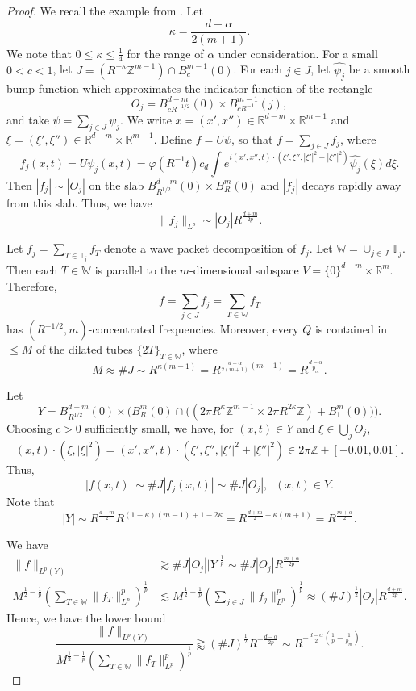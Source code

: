 \documentclass[11pt]{amsart}
\theoremstyle{definition}
\theoremstyle{remark}
\numberwithin{equation}{section}
\renewcommand{\hat}{\widehat}
\newcommand{\R}{\mathbb{R}}
\newcommand{\Z}{\mathbb{Z}}
\newcommand{\W}{\mathbb{W}}
\newcommand{\T}{\mathbb{T}}
\newcommand{\les}{\lesssim}
\begin{document}
\begin{proof}
We recall the example from \cite{du2023weighted}. Let 
\[ \kappa = \frac{d-\alpha}{2(m+1)}.\] 
We note that $0\leq \kappa  \leq \frac{1}{4}$ for the range of $\alpha$ under consideration.
For a small $0<c<1$, let $J = (R^{-\kappa}\Z^{m-1}) \cap B^{m-1}_{c}(0)$. For each $j\in J$, let $\hat{\psi_{j}}$ be a smooth bump function which approximates the indicator function of the rectangle
\[ O_j =B^{d-m}_{cR^{-1/2}}(0) \times B^{m-1}_{cR^{-1}}(j), \]
and take $\psi = \sum_{j\in J} \psi_j$. 
We write $x=(x',x'') \in \R^{d-m} \times \R^{m-1}$ and $\xi=(\xi',\xi'') \in \R^{d-m} \times \R^{m-1}$. 
Define $f=U\psi$, so that $f  = \sum_{j\in J} f_j$, where 
\[ f_j(x,t) = U \psi_{j}(x,t) =  \varphi(R^{-1} t) c_d \int e^{i(x',x'',t) \cdot (\xi',\xi'', |\xi'|^2+|\xi''|^2)} \hat{\psi_{j}}(\xi) d\xi.\]
Then $|f_{j}| \sim |O_j|$ on the slab $B^{d-m}_{R^{1/2}}(0) \times B^{m}_{R}(0)$ and $|f_j|$ decays rapidly away from this slab. Thus, we have
\[ \| f_j \|_{L^p} \sim | O_j| R^{\frac{d+m}{2p}}. \] 


Let $f_j = \sum_{T\in \T_j} f_T$ denote a wave packet decomposition of $f_j$. Let $\W = \cup_{j\in J} \T_j$. Then each $T \in \W$ is parallel to the $m$-dimensional subspace $V=\{0\}^{d-m} \times \R^m$. Therefore, 
\[ f= \sum_{j \in J} f_{j} =\sum_{T\in \W} f_T\]
has  $(R^{-1/2},m)$-concentrated frequencies. Moreover, every $Q$ is contained in $\leq M$ of the dilated tubes $\{ 2T\}_{T\in \W}$, where 
\[ M \approx \# J \sim R^{\kappa(m-1)} = R^{ \frac{d-\alpha}{2(m+1)}(m-1)} = R^{\frac{d-\alpha}{p_m}}.  \] 

Let 
\[ Y = B^{d-m}_{R^{1/2}}(0) \times \Big(   B^m_R(0)\cap \big( (2\pi R^{\kappa}\Z^{m-1} \times 2\pi R^{2\kappa} \Z)   + B^m_1(0) \big) \Big).  \]
Choosing $c>0$ sufficiently small, we have, for $(x,t)\in Y$ and
$\xi\in\bigcup_j O_j$,
\[ (x,t)\cdot(\xi, |\xi|^2) =  (x',x'',t) \cdot (\xi',\xi'', |\xi'|^2+|\xi''|^2) \in 2\pi\Z + [-0.01,0.01]. \]
Thus, \[ |f(x,t)| \sim \# J | f_j (x,t)| \sim \# J | O_j|, \;\; (x,t) \in Y.\]  Note that 
\[ |Y| \sim R^{\frac{d-m}{2}} R^{(1-\kappa)(m-1) + 1-2\kappa} = R^{\frac{d+m}{2} - \kappa(m+1)} = R^\frac{m+\alpha}{2}.\]

We have 
\begin{align*}
	\| f\|_{L^p(Y)} &\gtrsim \# J | O_j| |Y|^{\frac{1}{p}} \sim  \# J | O_j| R^{\frac{m+\alpha}{2p}} \\
M^{\frac{1}{2}-\frac{1}{p}} (\sum_{T\in \W} \| f_{T} \|_{L^p}^p)^{\frac{1}{p}} &\les 	M^{\frac{1}{2}-\frac{1}{p}} (\sum_{j\in J} \| f_j \|_{L^p}^p)^{\frac{1}{p}}  \approx (\# J)^{\frac{1}{2}} |O_j| R^{\frac{d+m}{2p}}.
\end{align*}
Hence, we have the lower bound
\begin{equation}\label{eqn:lower}
	\frac{	\| f\|_{L^p(Y)} }{M^{\frac{1}{2}-\frac{1}{p}} (\sum_{T\in \W} \| f_{T} \|_{L^p}^p)^{\frac{1}{p}}  } \gtrapprox (\# J)^{\frac{1}{2}} R^{-\frac{d-\alpha}{2p}}  \sim  R^{-\frac{d-\alpha}{2} ( \frac{1}{p}-\frac{1}{p_m})}. 
\end{equation}


\end{proof}
\end{document}

